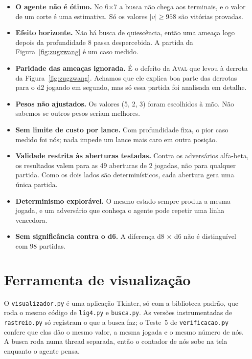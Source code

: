 \documentclass[11pt,a4paper]{article}
\newcommand{\fn}[1]{\textsc{#1}}            %
\newcommand{\arq}[1]{\texttt{#1}}
\begin{document}
\begin{itemize}
  \item \textbf{O agente não é ótimo.} No 6×7 a busca não chega aos terminais, e o valor de um corte é uma
        estimativa. Só os valores $|v| \ge 958$ são vitórias provadas.
  \item \textbf{Efeito horizonte.} Não há busca de quiescência, então uma ameaça logo depois da profundidade 8
        passa despercebida. A partida da Figura~\ref{fig:zugzwang} é um caso medido.
  \item \textbf{Paridade das ameaças ignorada.} É o defeito da \fn{Aval} que levou à derrota da
        Figura~\ref{fig:zugzwang}. Achamos que ele explica boa parte das derrotas para o d2 jogando em segundo,
        mas só essa partida foi analisada em detalhe.
  \item \textbf{Pesos não ajustados.} Os valores (5, 2, 3) foram escolhidos à mão. Não sabemos se outros pesos seriam melhores.
  \item \textbf{Sem limite de custo por lance.} Com profundidade fixa, o pior caso medido foi  nós;
        nada impede um lance mais caro em outra posição.
  \item \textbf{Validade restrita às aberturas testadas.} Contra os adversários alfa-beta, os resultados valem
        para as 49 aberturas de 2 jogadas, não para qualquer partida. Como os dois lados são determinísticos, cada
        abertura gera uma única partida.
  \item \textbf{Determinismo explorável.} O mesmo estado sempre produz a mesma jogada, e um adversário que
        conheça o agente pode repetir uma linha vencedora.
  \item \textbf{Sem significância contra o d6.} A diferença d8 × d6 não é distinguível com 98 partidas.
\end{itemize}

\section{Ferramenta de visualização}
\label{sec:viz}

O \arq{visualizador.py} é uma aplicação Tkinter, só com a biblioteca padrão, que roda o mesmo código de
\arq{lig4.py} e \arq{busca.py}. As versões instrumentadas de \arq{rastreio.py} só registram o que a busca faz; o
Teste~5 de \arq{verificacao.py} confere que elas dão o mesmo valor, a mesma jogada e o mesmo número de nós. A
busca roda numa thread separada, então o contador de nós sobe na tela enquanto o agente pensa.
\end{document}
